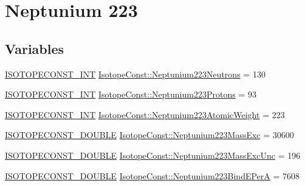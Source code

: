 \hypertarget{group___isotope_const-_neptunium-_np223}{}\section{Neptunium 223}
\label{group___isotope_const-_neptunium-_np223}
\subsection*{Variables}
\begin{DoxyCompactItemize}
\item 
\mbox{\hyperlink{group___isotope_const-_macros_ga5f18360b3e99483a35c32d789e62621c}{I\+S\+O\+T\+O\+P\+E\+C\+O\+N\+S\+T\+\_\+\+I\+NT}} \mbox{\hyperlink{group___isotope_const-_neptunium-_np223_ga1f696bdae6c9f8c1870ea32e0159a667}{Isotope\+Const\+::\+Neptunium223\+Neutrons}} = 130
\item 
\mbox{\hyperlink{group___isotope_const-_macros_ga5f18360b3e99483a35c32d789e62621c}{I\+S\+O\+T\+O\+P\+E\+C\+O\+N\+S\+T\+\_\+\+I\+NT}} \mbox{\hyperlink{group___isotope_const-_neptunium-_np223_gaceb7c3a308d18ad4e040f34247e074f5}{Isotope\+Const\+::\+Neptunium223\+Protons}} = 93
\item 
\mbox{\hyperlink{group___isotope_const-_macros_ga5f18360b3e99483a35c32d789e62621c}{I\+S\+O\+T\+O\+P\+E\+C\+O\+N\+S\+T\+\_\+\+I\+NT}} \mbox{\hyperlink{group___isotope_const-_neptunium-_np223_gac0cee0bbd2a0ad1eaa1f925a5a4f72f8}{Isotope\+Const\+::\+Neptunium223\+Atomic\+Weight}} = 223
\item 
\mbox{\hyperlink{group___isotope_const-_macros_ga8f45a7272ce02c0b4c65c44636ed719a}{I\+S\+O\+T\+O\+P\+E\+C\+O\+N\+S\+T\+\_\+\+D\+O\+U\+B\+LE}} \mbox{\hyperlink{group___isotope_const-_neptunium-_np223_gad647baa1b4eff244910b34f4153a9ef0}{Isotope\+Const\+::\+Neptunium223\+Mass\+Exc}} = 30600
\item 
\mbox{\hyperlink{group___isotope_const-_macros_ga8f45a7272ce02c0b4c65c44636ed719a}{I\+S\+O\+T\+O\+P\+E\+C\+O\+N\+S\+T\+\_\+\+D\+O\+U\+B\+LE}} \mbox{\hyperlink{group___isotope_const-_neptunium-_np223_gaf3b81d5e341c9aa6d82a6b35df4363c7}{Isotope\+Const\+::\+Neptunium223\+Mass\+Exc\+Unc}} = 196
\item 
\mbox{\hyperlink{group___isotope_const-_macros_ga8f45a7272ce02c0b4c65c44636ed719a}{I\+S\+O\+T\+O\+P\+E\+C\+O\+N\+S\+T\+\_\+\+D\+O\+U\+B\+LE}} \mbox{\hyperlink{group___isotope_const-_neptunium-_np223_gaa55519b58c1eaaa12d9e4b3b97e47d5e}{Isotope\+Const\+::\+Neptunium223\+Bind\+E\+PerA}} = 7608
\item 

\end{DoxyCompactItemize}

